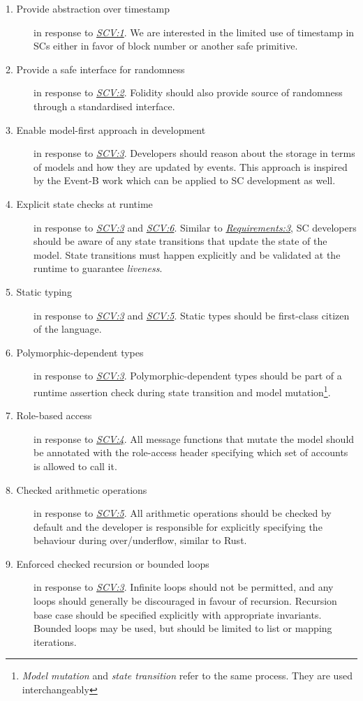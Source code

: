 \documentclass[oneside]{ecsproject}     %
\newcommand{\vref}[1]{\textit{\hyperref[#1]{#1}}}
\newcommand{\rref}[1]{\textit{\hyperref[#1]{#1}}}
\begin{document}
\begin{description}
  \item[1. Provide abstraction over timestamp]\label{Requirements:1} in response to \vref{SCV:1}. We are interested in the limited use of timestamp in SCs either in favor of block number or another safe primitive.
  \item[2. Provide a safe interface for randomness]\label{Requirements:2} in response to \vref{SCV:2}. Folidity should also provide source of randomness through a standardised interface.
  \item[3. Enable model-first approach in development]\label{Requirements:3} in response to \vref{SCV:3}. Developers should reason about the storage in terms of models and how they are updated by events. 
This approach is inspired by the Event-B\cite{event_b} work which can be applied to SC development as well.
  \item[4. Explicit state checks at runtime]\label{Requirements:4} in response to \vref{SCV:3} and \vref{SCV:6}. Similar to \rref{Requirements:3}, SC developers should be aware of any state transitions
that update the state of the model. State transitions must happen explicitly and be validated at the runtime to guarantee \textit{liveness}.
  \item[5. Static typing]\label{Requirements:5} in response to \vref{SCV:3} and \vref{SCV:5}. Static types should be first-class citizen of the language.
  \item[6. Polymorphic-dependent types]\label{Requirements:6} in response to \vref{SCV:3}. Polymorphic-dependent types should be part of a runtime assertion check 
during state transition and model mutation\footnote{\textit{Model mutation} and \textit{state transition} refer to the same process. They are used interchangeably}.
  \item[7. Role-based access]\label{Requirements: 7} in response to \vref{SCV:4}. 
All message functions that mutate the model should be annotated with the role-access header specifying which set of accounts is allowed to call it.
  \item[8. Checked arithmetic operations]\label{Requirements:8} in response to \vref{SCV:5}. 
All arithmetic operations should be checked by default and the developer is responsible for explicitly specifying the behaviour during over/underflow, similar to Rust.
  \item[9. Enforced checked recursion or bounded loops]\label{Requirements:9} in response to \vref{SCV:3}.
Infinite loops should not be permitted, and any loops should generally be discouraged in favour of recursion. Recursion base case should be specified explicitly with appropriate invariants.
Bounded loops may be used, but should be limited to list or mapping iterations.
\end{description}
\end{document}
